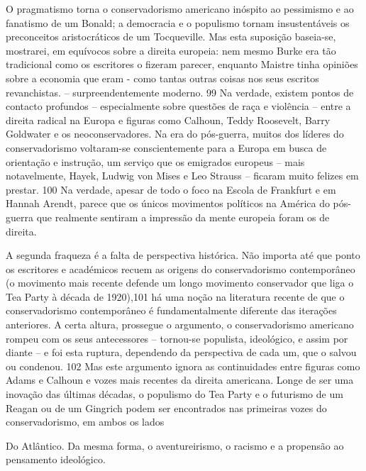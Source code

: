  \par 
O pragmatismo torna o conservadorismo americano inóspito ao pessimismo e ao fanatismo de um Bonald; a democracia e o populismo tornam insustentáveis ​​os preconceitos aristocráticos de um Tocqueville. Mas esta suposição baseia-se, mostrarei, em equívocos sobre a direita europeia: nem mesmo Burke era tão tradicional como os escritores o fizeram parecer, enquanto Maistre tinha opiniões sobre a economia que eram - como tantas outras coisas nos seus escritos revanchistas. – surpreendentemente moderno. {\color{blue}99} Na verdade, existem pontos de contacto profundos – especialmente sobre questões de raça e violência – entre a direita radical na Europa e figuras como Calhoun, Teddy Roosevelt, Barry Goldwater e os neoconservadores. Na era do pós-guerra, muitos dos líderes do conservadorismo voltaram-se conscientemente para a Europa em busca de orientação e instrução, um serviço que os emigrados europeus – mais notavelmente, Hayek, Ludwig von Mises e Leo Strauss – ficaram muito felizes em prestar. {\color{blue}100} Na verdade, apesar de todo o foco na Escola de Frankfurt e em Hannah Arendt, parece que os únicos movimentos políticos na América do pós-guerra que realmente sentiram a impressão da mente europeia foram os de direita.
 \par 
A segunda fraqueza é a falta de perspectiva histórica. Não importa até que ponto os escritores e académicos recuem as origens do conservadorismo contemporâneo (o movimento mais recente defende um longo movimento conservador que liga o Tea Party à década de 1920),101 há uma noção na literatura recente de que o conservadorismo contemporâneo é fundamentalmente diferente das iterações anteriores. A certa altura, prossegue o argumento, o conservadorismo americano rompeu com os seus antecessores – tornou-se populista, ideológico, e assim por diante – e foi esta ruptura, dependendo da perspectiva de cada um, que o salvou ou condenou. {\color{blue}102} Mas este argumento ignora as continuidades entre figuras como Adams e Calhoun e vozes mais recentes da direita americana. Longe de ser uma inovação das últimas décadas, o populismo do Tea Party e o futurismo de um Reagan ou de um Gingrich podem ser encontrados nas primeiras vozes do conservadorismo, em ambos os lados
 \par 
Do Atlântico. Da mesma forma, o aventureirismo, o racismo e a propensão ao pensamento ideológico.
 \par 
